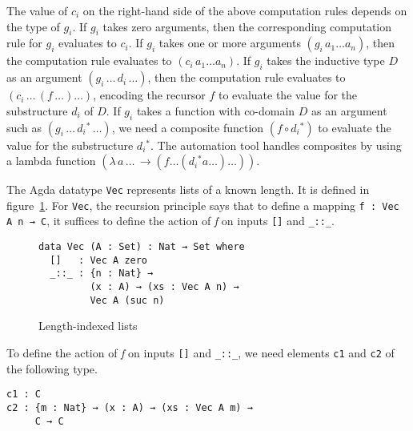\documentclass[sigplan,10pt]{acmart}
\begin{document}
The value of $c_i$ on the right-hand side of the above computation rules depends on the type of $g_i$. If $g_i$ takes zero arguments, then the corresponding computation rule for $g_i$ evaluates to $c_i$. If $g_i$ takes one or more arguments $(g_i \, a_1 \ldots a_n)$, then the computation rule evaluates to $(c_i \, a_1 \ldots a_n)$. If $g_i$ takes the inductive type $D$ as an argument $(g_i \, \ldots \, d_i \, \ldots)$, then the computation rule evaluates to $(c_i \, \ldots \, (f \, \ldots) \ldots)$, encoding the recursor $f$ to evaluate the value for the substructure $d_i$ of $D$. If $g_i$ takes a function with co-domain $D$ as an argument such as $(g_i \, \ldots \, d{_i}^* \, \ldots)$, we need a composite function $(f \circ d{_i}^*)$ to evaluate the value for the substructure $d{_i}^*$. The automation tool handles composites by using a lambda function $(\lambda \, a \, \ldots \, \rightarrow (f \ldots (d{_i}^* a \ldots) \ldots))$.

The Agda datatype \texttt{Vec} represents lists of a known length. It is defined in figure~\ref{fig:vec}. For {\tt Vec}, the recursion principle says that to define a mapping {\tt f : Vec A n → C}, it suffices to define the action of \emph{f} on inputs {\tt []} and {\tt \_::\_}.

\begin{figure}
\begin{center}
\begingroup
\begin{BVerbatim}
data Vec (A : Set) : Nat → Set where
  []   : Vec A zero
  _::_ : {n : Nat} →
         (x : A) → (xs : Vec A n) → 
         Vec A (suc n)
\end{BVerbatim}
\endgroup
\end{center}
\caption{Length-indexed lists}
\label{fig:vec}
\end{figure}

To define the action of \emph{f} on inputs {\tt []} and {\tt \_::\_}, we need elements {\tt c1} and {\tt c2} of the following type.

\begin{center}
\begingroup
\begin{BVerbatim}
c1 : C
c2 : {m : Nat} → (x : A) → (xs : Vec A m) → 
     C → C
\end{BVerbatim}
\endgroup
\end{center}
\normalsize
\end{document}
